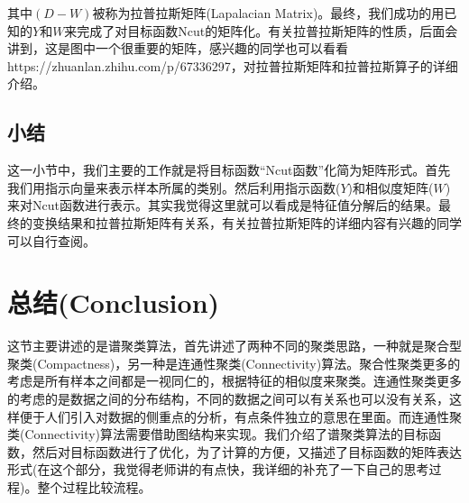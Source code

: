 \documentclass[a4paper]{article}
\begin{document}
其中$(D-W)$被称为拉普拉斯矩阵(Lapalacian Matrix)。最终，我们成功的用已知的$Y$和$W$来完成了对目标函数Ncut的矩阵化。有关拉普拉斯矩阵的性质，后面会讲到，这是图中一个很重要的矩阵，感兴趣的同学也可以看看https://zhuanlan.zhihu.com/p/67336297，对拉普拉斯矩阵和拉普拉斯算子的详细介绍。

\subsection{小结}
这一小节中，我们主要的工作就是将目标函数“Ncut函数”化简为矩阵形式。首先我们用指示向量来表示样本所属的类别。然后利用指示函数($Y$)和相似度矩阵($W$)来对Ncut函数进行表示。其实我觉得这里就可以看成是特征值分解后的结果。最终的变换结果和拉普拉斯矩阵有关系，有关拉普拉斯矩阵的详细内容有兴趣的同学可以自行查阅。

\section{总结(Conclusion)}
这节主要讲述的是谱聚类算法，首先讲述了两种不同的聚类思路，一种就是聚合型聚类(Compactness)，另一种是连通性聚类(Connectivity)算法。聚合性聚类更多的考虑是所有样本之间都是一视同仁的，根据特征的相似度来聚类。连通性聚类更多的考虑的是数据之间的分布结构，不同的数据之间可以有关系也可以没有关系，这样便于人们引入对数据的侧重点的分析，有点条件独立的意思在里面。而连通性聚类(Connectivity)算法需要借助图结构来实现。我们介绍了谱聚类算法的目标函数，然后对目标函数进行了优化，为了计算的方便，又描述了目标函数的矩阵表达形式(在这个部分，我觉得老师讲的有点快，我详细的补充了一下自己的思考过程)。整个过程比较流程。
\end{document}
